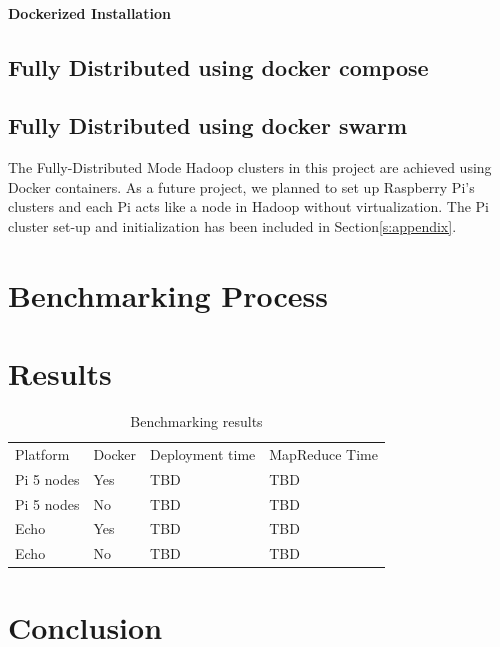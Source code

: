 \paragraph{Dockerized Installation}

\subsection{Fully Distributed using docker compose}

\subsection{Fully Distributed using docker swarm}


The Fully-Distributed Mode Hadoop clusters in this project are achieved 
using Docker containers. As a future project, we planned to set up Raspberry 
Pi's clusters and each Pi acts like a node in Hadoop without virtualization. 
The Pi cluster set-up and initialization has been included in 
Section\ref{s:appendix}.

\section{Benchmarking Process}\label{s:benchrproc}


\section{Results}\label{s:results}

\begin{table}[hbt]
\centering
\caption{Benchmarking results}\label{t:results-table}
\begin{tabular}{llll}
Platform    & Docker & Deployment time & MapReduce Time \\
Pi 5 nodes  & Yes    & TBD             & TBD            \\
Pi 5 nodes  & No     & TBD             & TBD            \\
Echo        & Yes    & TBD             & TBD            \\
Echo        & No     & TBD             & TBD            \\
\end{tabular}
\end{table}



\section{Conclusion}\label{s:conclusion}

